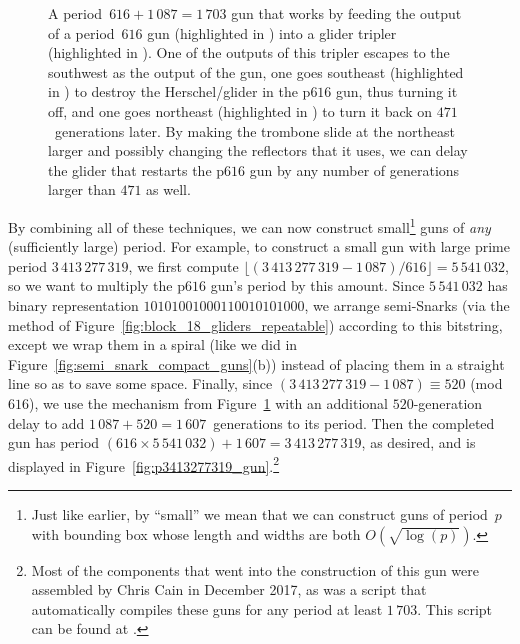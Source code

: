 \begin{figure}[!htb]
	\centering
	\caption{A period~$616+1\, 087 = 1\, 703$ gun that works by feeding the output of a period~$616$ gun (highlighted in ) into a glider tripler (highlighted in ). One of the outputs of this tripler escapes to the southwest as the output of the gun, one goes southeast (highlighted in ) to destroy the Herschel/glider in the p$616$ gun, thus turning it off, and one goes northeast (highlighted in ) to turn it back on $471$~generations later. By making the trombone slide at the northeast larger and possibly changing the reflectors that it uses, we can delay the glider that restarts the p$616$ gun by any number of generations larger than $471$ as well.}
	\label{fig:p1703_gun}
\end{figure}

By combining all of these techniques, we can now construct small\footnote{Just like earlier, by ``small'' we mean that we can construct guns of period~$p$ with bounding box whose length and widths are both $O(\sqrt{\log(p)})$.} guns of \emph{any} (sufficiently large) period. For example, to construct a small gun with large prime period $3\, 413\, 277\, 319$, we first compute $\lfloor (3\, 413\, 277\, 319 - 1\, 087) / 616 \rfloor = 5\, 541\, 032$, so we want to multiply the p$616$ gun's period by this amount. Since $5\, 541\, 032$ has binary representation $10101001000110010101000$, we arrange semi-Snarks (via the method of Figure~\ref{fig:block_18_gliders_repeatable}) according to this bitstring, except we wrap them in a spiral (like we did in Figure~\ref{fig:semi_snark_compact_guns}(b)) instead of placing them in a straight line so as to save some space. Finally, since $(3\, 413\, 277\, 319 - 1\, 087) \equiv 520$ (mod $616$), we use the mechanism from Figure~\ref{fig:p1703_gun} with an additional $520$-generation delay to add $1\, 087+520 = 1\, 607$~generations to its period. Then the completed gun has period $(616 \times 5\, 541\, 032) + 1\, 607 = 3\, 413\, 277\, 319$, as desired, and is displayed in Figure~\ref{fig:p3413277319_gun}.\footnote{Most of the components that went into the construction of this gun were assembled by Chris Cain in December 2017, as was a script that automatically compiles these guns for any period at least $1\, 703$. This script can be found at .}

